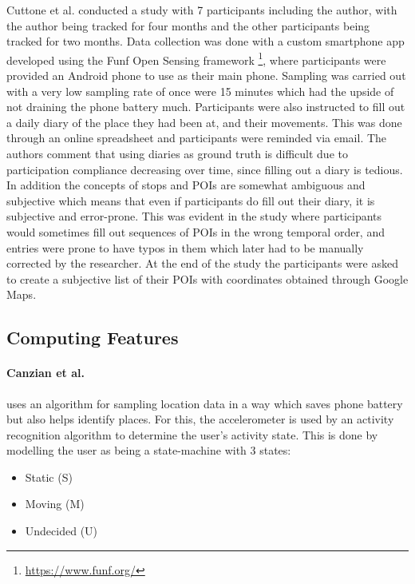 Cuttone et al. conducted a study with 7 participants including the author, with the author being tracked for four months and the other participants being tracked for two months. Data collection was done with a custom smartphone app developed using the Funf Open Sensing framework \footnote{\url{https://www.funf.org/}}, where participants were provided an Android phone to use as their main phone. Sampling was carried out with a very low sampling rate of once were 15 minutes which had the upside of not draining the phone battery much. Participants were also instructed to fill out a daily diary of the place they had been at, and their movements. This was done through an online spreadsheet and participants were reminded via email. The authors comment that using diaries as ground truth is difficult due to participation compliance decreasing over time, since filling out a diary is tedious. In addition the concepts of stops and POIs are somewhat ambiguous and subjective which means that even if participants do fill out their diary, it is subjective and error-prone. This was evident in the study where participants would sometimes fill out sequences of POIs in the wrong temporal order, and entries were prone to have typos in them which later had to be manually corrected by the researcher. At the end of the study the participants were asked to create a subjective list of their POIs with coordinates obtained through Google Maps. \\

\subsection{Computing Features}
\paragraph{Canzian et al.} uses an algorithm for sampling location data in a way which saves phone battery but also helps identify places. For this, the accelerometer is used by an activity recognition algorithm to determine the user's activity state. This is done by modelling the user as being a state-machine with 3 states: 
\begin{itemize}
    \item Static (S)
    \item Moving (M)
    \item Undecided (U)
\end{itemize}

